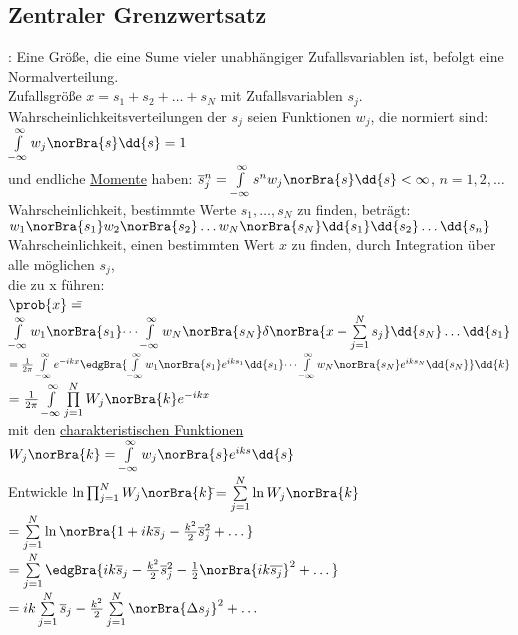 \subsection{Zentraler Grenzwertsatz}
\begin{tabbing}
: Eine Größe, die eine Sume vieler unabhängiger Zufallsvariablen ist, befolgt eine Normalverteilung.\\
Zufallsgröße $x = s_1 + s_2 +\dots + s_N$ mit Zufallsvariablen $s_j$.\\
Wahrscheinlichkeitsverteilungen der $s_j$ seien Funktionen $w_j$, die normiert sind: $\int\limits_{-\infty}^{\infty} w_j\norBra{s} \dd{s} = 1$\\
und endliche \underline{Momente} haben: $\overline{s}_j^n = \int\limits_{-\infty}^{\infty} s^n w_j\norBra{s}\dd{s} < \infty$, $n = 1,2,\dots$\\
Wahrscheinlichkeit, bestimmte Werte $s_1,\dots,s_N$ zu finden, beträgt:\\ $w_1\norBra{s_1}w_2\norBra{s_2} \dots w_N\norBra{s_N} \dd{s_1}\dd{s_2}\dots\dd{s_n}$\\
Wahrscheinlichkeit, einen bestimmten Wert $x$ zu finden, durch Integration über alle möglichen $s_j$,\\ die zu x führen:\\
$\prob{x} =$\=$\int\limits_{-\infty}^{\infty}w_1\norBra{s_1}\dots\int\limits_{-\infty}^{\infty}w_N\norBra{s_N} \delta\norBra{x-\sum\limits_{j=1}^{N}s_j}\dd{s_N}\dots\dd{s_1}$\\
\>$=\frac{1}{2\pi}\int\limits_{-\infty}^{\infty}e^{-i k x} \edgBra{\int\limits_{-\infty}^{\infty} w_1\norBra{s_1}e^{i k s_1}\dd{s_1} \dots \int\limits_{-\infty}^{\infty} w_N\norBra{s_N}e^{i k s_N} \dd{s_N}}\dd{k}$\\
\>$=\frac{1}{2\pi} \int\limits_{-\infty}^{\infty}\prod\limits_{j=1}^N W_j\norBra{k} e^{- i k x}$\\
mit den \underline{charakteristischen Funktionen} $W_j\norBra{k} = \int\limits_{-\infty}^{\infty} w_j\norBra{s}e^{i k s} \dd{s}$\\
Entwickle $\ln\prod_{j=1}^N W_j\norBra{k}$\=$=\sum\limits_{j=1}^N\ln W_j\norBra{k}$\\
\>$=\sum\limits_{j=1}^N \ln \norBra{1 + i k \overline{s}_j - \frac{k^2}{2}\overline{s}_j^2+\dots}$\\
\>$=\sum\limits_{j=1}^N\edgBra{i k \overline{s}_j - \frac{k^2}{2} \overline{s}_j^2 - \frac12 \norBra{i k \overline{s_j}}^2+ \dots}$\\
\>$=i k \sum\limits_{j=1}^N \overline{s}_j - \frac{k^2}{2}\sum\limits_{j=1}^N \norBra{\Delta s_j}^2 + \dots$\\

\end{tabbing}
